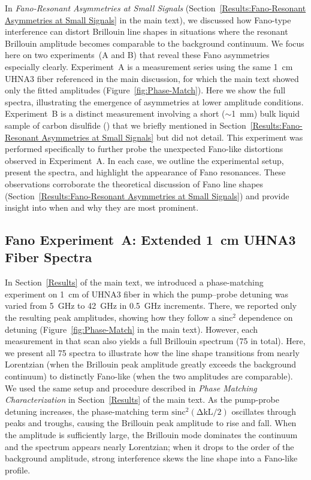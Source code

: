 In \textit{Fano-Resonant Asymmetries at Small Signals} (Section~\ref{Results:Fano-Resonant Asymmetries at Small Signals} in the main text), we discussed how Fano-type interference can distort Brillouin line shapes in situations where the resonant Brillouin amplitude becomes comparable to the background continuum. We focus here on two experiments~(A and B) that reveal these Fano asymmetries especially clearly. Experiment~A is a measurement series using the same \SI{1}{\centi\meter} \ac{UHNA3} fiber referenced in the main discussion, for which the main text showed only the fitted amplitudes (Figure~\ref{fig:Phase-Match}). Here we show the full spectra, illustrating the emergence of asymmetries at lower amplitude conditions. Experiment~B is a distinct measurement involving a short (\(\sim\)\SI{1}{\milli\meter}) bulk liquid sample of carbon disulfide () that we briefly mentioned in Section~\ref{Results:Fano-Resonant Asymmetries at Small Signals} but did not detail. This experiment was performed specifically to further probe the unexpected Fano-like distortions observed in Experiment~A. In each case, we outline the experimental setup, present the spectra, and highlight the appearance of Fano resonances. These observations corroborate the theoretical discussion of Fano line shapes (Section~\ref{Results:Fano-Resonant Asymmetries at Small Signals}) and provide insight into when and why they are most prominent.

\subsection{Fano Experiment~A: Extended \SI{1}{\centi\meter} UHNA3 Fiber Spectra}
\label{Appendix:Fano:Experiment A}

In Section~\ref{Results} of the main text, we introduced a phase-matching experiment on \SI{1}{\centi\meter} of \ac{UHNA3} fiber in which the pump--probe detuning was varied from \SI{5}{\giga\hertz} to \SI{42}{\giga\hertz} in \SI{0.5}{\giga\hertz} increments. There, we reported only the resulting peak amplitudes, showing how they follow a \(\mathrm{sinc^{2}}\) dependence on detuning (Figure~\ref{fig:Phase-Match} in the main text). However, each measurement in that scan also yields a full Brillouin spectrum (75 in total). Here, we present all 75 spectra to illustrate how the line shape transitions from nearly Lorentzian (when the Brillouin peak amplitude greatly exceeds the background continuum) to distinctly Fano-like (when the two amplitudes are comparable). We used the same setup and procedure described in \textit{Phase Matching Characterization} in Section~\ref{Results} of the main text. As the pump-probe detuning increases, the phase-matching term \(\mathrm{sinc^{2}(\Delta kL/2)}\) oscillates through peaks and troughs, causing the Brillouin peak amplitude to rise and fall. When the amplitude is sufficiently large, the Brillouin mode dominates the continuum and the spectrum appears nearly Lorentzian; when it drops to the order of the background amplitude, strong interference skews the line shape into a Fano-like profile.

